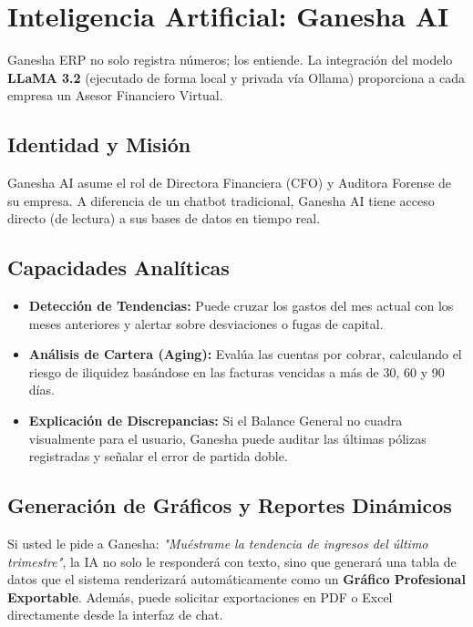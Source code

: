 \documentclass[12pt, a4paper, oneside]{book}
\begin{document}
\chapter{Inteligencia Artificial: Ganesha AI}

Ganesha ERP no solo registra números; los entiende. La integración del modelo \textbf{LLaMA 3.2} (ejecutado de forma local y privada vía Ollama) proporciona a cada empresa un Asesor Financiero Virtual.

\section{Identidad y Misión}
Ganesha AI asume el rol de Directora Financiera (CFO) y Auditora Forense de su empresa. A diferencia de un chatbot tradicional, Ganesha AI tiene acceso directo (de lectura) a sus bases de datos en tiempo real.

\section{Capacidades Analíticas}
\begin{itemize}
    \item \textbf{Detección de Tendencias:} Puede cruzar los gastos del mes actual con los meses anteriores y alertar sobre desviaciones o fugas de capital.
    \item \textbf{Análisis de Cartera (Aging):} Evalúa las cuentas por cobrar, calculando el riesgo de iliquidez basándose en las facturas vencidas a más de 30, 60 y 90 días.
    \item \textbf{Explicación de Discrepancias:} Si el Balance General no cuadra visualmente para el usuario, Ganesha puede auditar las últimas pólizas registradas y señalar el error de partida doble.
\end{itemize}

\section{Generación de Gráficos y Reportes Dinámicos}
\begin{notainfo}
Si usted le pide a Ganesha: \textit{"Muéstrame la tendencia de ingresos del último trimestre"}, la IA no solo le responderá con texto, sino que generará una tabla de datos que el sistema renderizará automáticamente como un \textbf{Gráfico Profesional Exportable}. Además, puede solicitar exportaciones en PDF o Excel directamente desde la interfaz de chat.
\end{notainfo}
\end{document}
